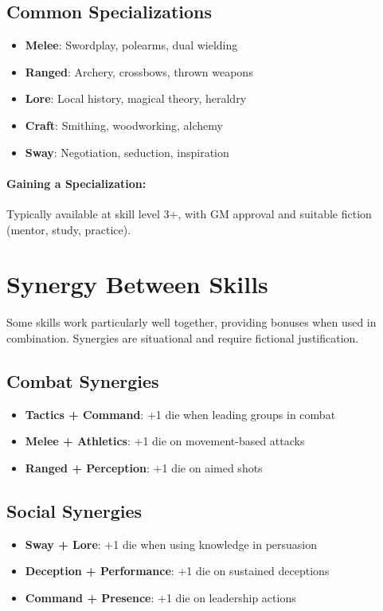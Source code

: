 \begin{multicols}{2}
\subsection*{Common Specializations}
\begin{itemize}
\item \textbf{Melee}: Swordplay, polearms, dual wielding
\item \textbf{Ranged}: Archery, crossbows, thrown weapons
\item \textbf{Lore}: Local history, magical theory, heraldry
\item \textbf{Craft}: Smithing, woodworking, alchemy
\item \textbf{Sway}: Negotiation, seduction, inspiration
\end{itemize}

\paragraph{Gaining a Specialization:}
Typically available at skill level 3+, with GM approval and suitable fiction (mentor, study, practice).

\section{Synergy Between Skills}

Some skills work particularly well together, providing bonuses when used in combination. Synergies are situational and require fictional justification.

\subsection*{Combat Synergies}
\begin{itemize}
\item \textbf{Tactics + Command}: +1 die when leading groups in combat
\item \textbf{Melee + Athletics}: +1 die on movement-based attacks
\item \textbf{Ranged + Perception}: +1 die on aimed shots
\end{itemize}

\subsection*{Social Synergies}
\begin{itemize}
\item \textbf{Sway + Lore}: +1 die when using knowledge in persuasion
\item \textbf{Deception + Performance}: +1 die on sustained deceptions
\item \textbf{Command + Presence}: +1 die on leadership actions
\end{itemize}


\end{multicols}
